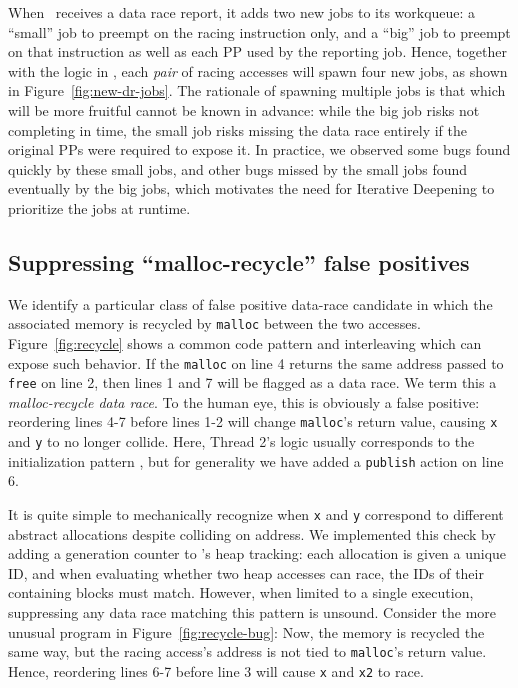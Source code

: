 When \quicksand~receives a data race report, it adds two new jobs to its workqueue:
a ``small'' job to preempt on the racing instruction only,
and a ``big'' job to preempt on that instruction as well as each PP used by the reporting job.
%
Hence, together with the logic in \sect{\ref{sec:classifying}}, each {\em pair} of racing accesses will spawn four new jobs, as shown in Figure~\ref{fig:new-dr-jobs}.
%
The rationale of spawning multiple jobs is that which will be more fruitful cannot be known in advance:
while the big job risks not completing in time,
the small job risks missing the data race entirely if the original PPs were required to expose it.
In practice, we observed some bugs found quickly by these small jobs, and other bugs missed by the small jobs found eventually by the big jobs,
which motivates the need for Iterative Deepening to prioritize the jobs at runtime.

\subsection{Suppressing ``malloc-recycle'' false positives}
\label{sec:recycle}

We identify a particular class of false positive data-race candidate in which the associated memory is recycled by {\tt malloc} between the two accesses.
Figure~\ref{fig:recycle} shows a common code pattern and interleaving which can expose such behavior.
If the {\tt malloc} on line 4 returns the same address passed to {\tt free} on line 2, then lines 1 and 7 will be flagged as a data race.
We term this a {\em malloc-recycle data race}.
To the human eye, this is obviously a false positive: reordering lines 4-7 before lines 1-2 will change {\tt malloc}'s return value, causing {\tt x} and {\tt y} to no longer collide.
Here, Thread 2's logic usually corresponds to the initialization pattern \cite{eraser}, but for generality we have added a {\tt publish} action on line 6.


It is quite simple to mechanically recognize when {\tt x} and {\tt y} correspond to different abstract allocations despite colliding on address.
We implemented this check by adding a generation counter to \landslide's heap tracking:
each allocation is given a unique ID,
and when evaluating whether two heap accesses can race,
the IDs of their containing blocks must match.
However, when limited to a single execution, suppressing any data race matching this pattern is unsound.
Consider the more unusual program in Figure~\ref{fig:recycle-bug}:
Now, the memory is recycled the same way, but the racing access's address is not tied to {\tt malloc}'s return value.
Hence, reordering lines 6-7 before line 3 will cause {\tt x} and {\tt x2} to race.

